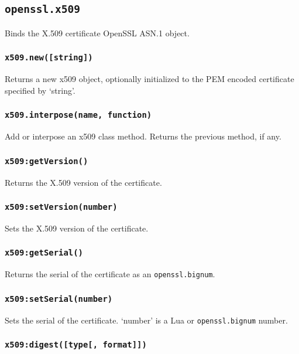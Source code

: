 \documentclass[11pt, oneside]{memoir}
\newcommand*{\fn}[1]{\texttt{#1}\xspace}
\newcommand*{\module}[1]{\texttt{#1}\xspace}
\newcounter{toccols}
\newenvironment{Module}[1]{
	\subsection{\texttt{#1}}
	\addtocontents{toc}{
		\protect\begin{multicols}{\value{toccols}}
	}
}{
	\addtocontents{toc}{\protect\end{multicols}}
}
\begin{document}
\begin{Module}{openssl.x509}

Binds the X.509 certificate OpenSSL ASN.1 object.

\subsubsection[\fn{x509.new}]{\fn{x509.new([string])}}

Returns a new x509 object, optionally initialized to the PEM encoded certificate specified by `string'.

\subsubsection[\fn{x509.interpose}]{\fn{x509.interpose(name, function)}}

Add or interpose an x509 class method. Returns the previous method, if any.

\subsubsection[\fn{x509:getVersion}]{\fn{x509:getVersion()}}

Returns the X.509 version of the certificate.

\subsubsection[\fn{x509:setVersion}]{\fn{x509:setVersion(number)}}

Sets the X.509 version of the certificate.

\subsubsection[\fn{x509:getSerial}]{\fn{x509:getSerial()}}

Returns the serial of the certificate as an \module{openssl.bignum}.

\subsubsection[\fn{x509:setSerial}]{\fn{x509:setSerial(number)}}

Sets the serial of the certificate. `number' is a Lua or \module{openssl.bignum} number.

\subsubsection[\fn{x509:digest}]{\fn{x509:digest([type[, format]])}}


\end{Module}
\end{document}
